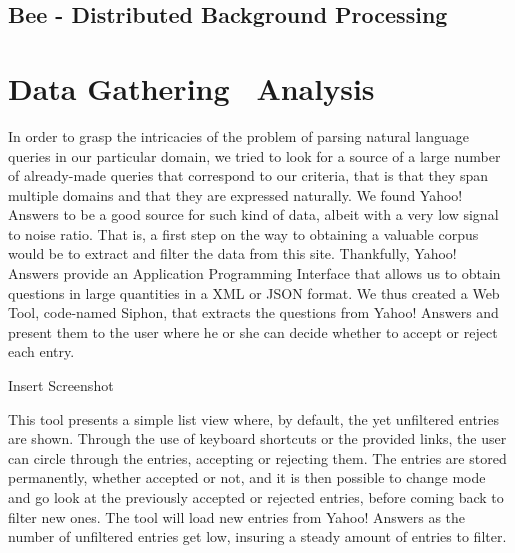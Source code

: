 
\subsection{Bee - Distributed Background Processing} %
\label{sub:bee_distributed_background_processing}





\section{Data Gathering \amper\ Analysis} %
\label{sec:data_gathering_and_analysis}

In order to grasp the intricacies of the problem of parsing natural language queries in our particular domain, we tried to look for a source of a large number of already-made queries that correspond to our criteria, that is that they span multiple domains and that they are expressed naturally. We found Yahoo! Answers to be a good source for such kind of data, albeit with a very low signal to noise ratio. That is, a first step on the way to obtaining a valuable corpus would be to extract and filter the data from this site. Thankfully, Yahoo! Answers provide an Application Programming Interface that allows us to obtain questions in large quantities in a XML or JSON format. We thus created a Web Tool, code-named Siphon, that extracts the questions from Yahoo! Answers and present them to the user where he or she can decide whether to accept or reject each entry.

\begin{huge}
  Insert Screenshot
\end{huge}

This tool presents a simple list view where, by default, the yet unfiltered entries are shown. Through the use of keyboard shortcuts or the provided links, the user can circle through the entries, accepting or rejecting them. The entries are stored permanently, whether accepted or not, and it is then possible to change mode and go look at the previously accepted or rejected entries, before coming back to filter new ones. The tool will load new entries from Yahoo! Answers as the number of unfiltered entries get low, insuring a steady amount of entries to filter.

